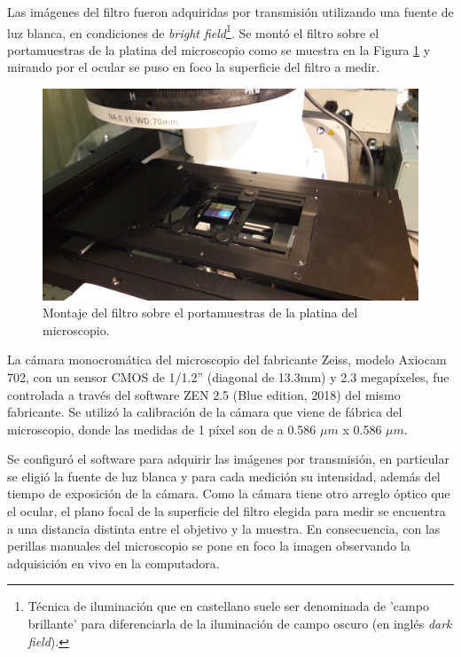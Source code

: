 Las imágenes del filtro fueron adquiridas por transmisión utilizando una fuente de luz blanca, en condiciones de \textit{bright field}\footnote{Técnica de iluminación que en castellano suele ser denominada de 'campo brillante' para diferenciarla de la iluminación de campo oscuro (en inglés \textit{dark field}).}. Se montó el filtro sobre el portamuestras de la platina del microscopio como se muestra en la Figura \ref{fig:filtroenZEISS} y mirando por el ocular se puso en foco la superficie del filtro a medir.  
\begin{figure}[H]
	\centering
	\includegraphics[scale=0.08]{Figs/defectosZEISS/a.jpg}
	\caption{Montaje del filtro sobre el portamuestras de la platina del microscopio.}
	\label{fig:filtroenZEISS}
\end{figure}
La cámara monocromática del microscopio del fabricante Zeiss, modelo Axiocam 702, con un sensor CMOS de 1/1.2'' (diagonal de 13.3mm) y 2.3 megapíxeles, fue controlada a través del software ZEN 2.5 (Blue edition, 2018) del mismo fabricante. Se utilizó la calibración de la cámara que viene de fábrica del microscopio, donde las medidas de 1 píxel son de a 0.586 $\mu m$ x 0.586 $\mu m$. 

Se configuró el software para adquirir las imágenes por transmisión, en particular se eligió la fuente de luz blanca y para cada medición su intensidad, además del tiempo de exposición de la cámara. Como la cámara tiene otro arreglo óptico que el ocular, el plano focal de la superficie del filtro elegida para medir se encuentra a una distancia distinta entre el objetivo y la muestra. En consecuencia, con las perillas manuales del microscopio se pone en foco la imagen observando la adquisición en vivo en la computadora.


